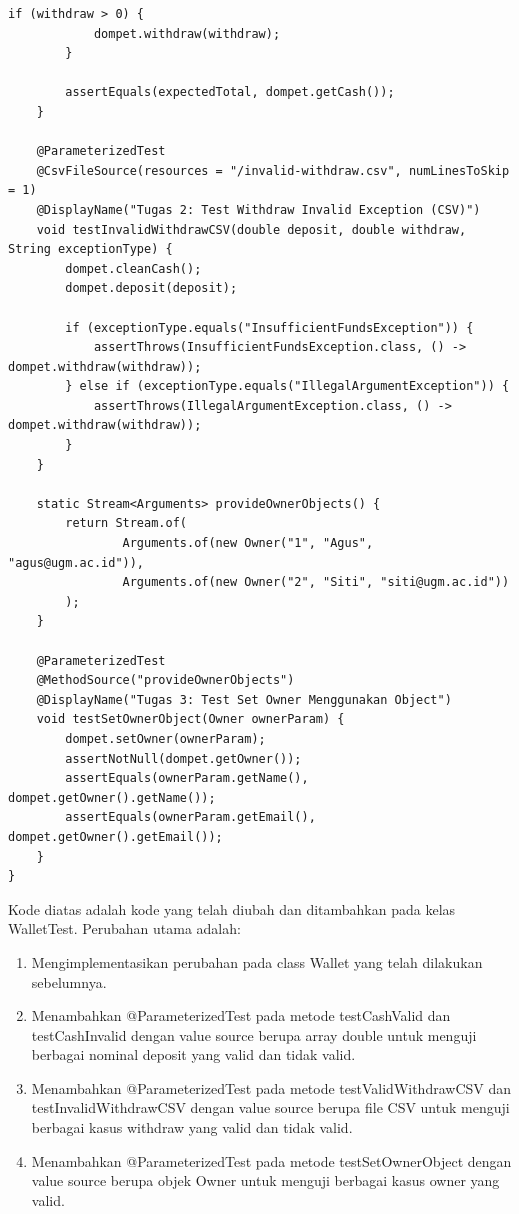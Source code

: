\documentclass[a4paper,12pt]{article}
\begin{document}
\begin{lstlisting}[style=javastyle, caption=WalletTest.java]
        if (withdraw > 0) {
            dompet.withdraw(withdraw);
        }

        assertEquals(expectedTotal, dompet.getCash());
    }

    @ParameterizedTest
    @CsvFileSource(resources = "/invalid-withdraw.csv", numLinesToSkip = 1)
    @DisplayName("Tugas 2: Test Withdraw Invalid Exception (CSV)")
    void testInvalidWithdrawCSV(double deposit, double withdraw, String exceptionType) {
        dompet.cleanCash();
        dompet.deposit(deposit);

        if (exceptionType.equals("InsufficientFundsException")) {
            assertThrows(InsufficientFundsException.class, () -> dompet.withdraw(withdraw));
        } else if (exceptionType.equals("IllegalArgumentException")) {
            assertThrows(IllegalArgumentException.class, () -> dompet.withdraw(withdraw));
        }
    }

    static Stream<Arguments> provideOwnerObjects() {
        return Stream.of(
                Arguments.of(new Owner("1", "Agus", "agus@ugm.ac.id")),
                Arguments.of(new Owner("2", "Siti", "siti@ugm.ac.id"))
        );
    }

    @ParameterizedTest
    @MethodSource("provideOwnerObjects")
    @DisplayName("Tugas 3: Test Set Owner Menggunakan Object")
    void testSetOwnerObject(Owner ownerParam) {
        dompet.setOwner(ownerParam);
        assertNotNull(dompet.getOwner());
        assertEquals(ownerParam.getName(), dompet.getOwner().getName());
        assertEquals(ownerParam.getEmail(), dompet.getOwner().getEmail());
    }
}
\end{lstlisting}
Kode diatas adalah kode yang telah diubah dan ditambahkan pada kelas WalletTest. Perubahan utama adalah:
\begin{enumerate}
    \item Mengimplementasikan perubahan pada class Wallet yang telah dilakukan sebelumnya.
    \item Menambahkan @ParameterizedTest pada metode testCashValid dan testCashInvalid dengan value source berupa array double untuk menguji berbagai nominal deposit yang valid dan tidak valid.
    \item Menambahkan @ParameterizedTest pada metode testValidWithdrawCSV dan testInvalidWithdrawCSV dengan value source berupa file CSV untuk menguji berbagai kasus withdraw yang valid dan tidak valid.
    \item Menambahkan @ParameterizedTest pada metode testSetOwnerObject dengan value source berupa objek Owner untuk menguji berbagai kasus owner yang valid.
\end{enumerate}
\end{document}
